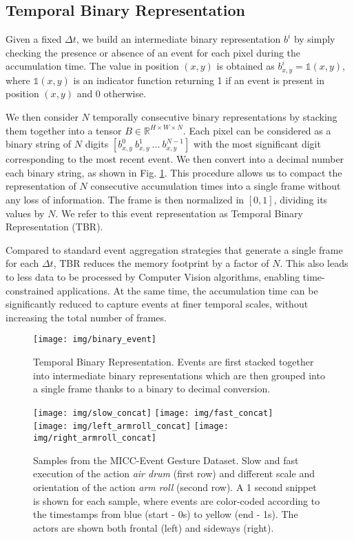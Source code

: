 \documentclass[a4paper,conference]{IEEEtran}
\begin{document}
\subsection{Temporal Binary Representation}
Given a fixed $\Delta t$, we build an intermediate binary representation $b^i$ by simply checking the presence or absence of an event for each pixel during the accumulation time. The value in position $(x,y)$ is obtained as $b^i_{x,y} = \mathds{1}(x,y)$, where $\mathds{1}(x,y)$ is an indicator function returning 1 if an event is present in position $(x,y)$ and 0 otherwise.

We then consider $N$ temporally consecutive binary representations by stacking them together into a tensor $B \in \mathbb{R}^{H \times W \times N}$. Each pixel can be considered as a binary string of $N$ digits $[b^0_{x,y}~ b^1_{x,y}~ ...~ b^{N-1}_{x,y}]$ with the most significant digit corresponding to the most recent event. We then convert into a decimal number each binary string, as shown in Fig. \ref{fig:binaryevent}. This procedure allows us to compact the representation of $N$ consecutive accumulation times into a single frame without any loss of information. The frame is then normalized in $[0, 1]$, dividing its values by $N$.
We refer to this event representation as Temporal Binary Representation (TBR).

Compared to standard event aggregation strategies that generate a single frame for each $\Delta t$, TBR reduces the memory footprint by a factor of $N$. This also leads to less data to be processed by Computer Vision algorithms, enabling time-constrained applications. At the same time, the accumulation time can be significantly reduced to capture events at finer temporal scales, without increasing the total number of frames.

\begin{figure}[!t]
	\centering
	\texttt{[image: img/binary\_event]}
	\caption{Temporal Binary Representation. Events are first stacked together into intermediate binary representations which are then grouped into a single frame thanks to a binary to decimal conversion.}
	\label{fig:binaryevent}
\end{figure}

\begin{figure*}[t]
	\centering
	\texttt{[image: img/slow\_concat]}
	\texttt{[image: img/fast\_concat]}\\
	\texttt{[image: img/left\_armroll\_concat]}
	\texttt{[image: img/right\_armroll\_concat]}\\
	\caption{Samples from the MICC-Event Gesture Dataset. Slow and fast execution of the action \textit{air drum} (first row) and different scale and orientation of the action \textit{arm roll} (second row). A 1 second snippet is shown for each sample, where events are color-coded according to the timestamps from blue (start - 0s) to yellow (end - 1s). The actors are shown both frontal (left) and sideways (right).}
	\label{fig:recordings}
\end{figure*}
\end{document}
